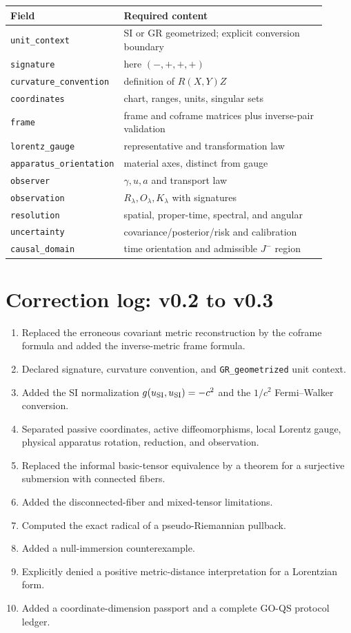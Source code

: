 \documentclass[11pt,a4paper]{article}
\theoremstyle{definition}
\theoremstyle{plain}
\theoremstyle{remark}
\begin{document}
\begin{longtable}{L{0.27\linewidth}L{0.64\linewidth}}
\toprule
Field & Required content\\
\midrule
\endhead
\texttt{unit\_context} & SI or GR geometrized; explicit conversion boundary\\
\texttt{signature} & here $(-,+,+,+)$\\
\texttt{curvature\_convention} & definition of $R(X,Y)Z$\\
\texttt{coordinates} & chart, ranges, units, singular sets\\
\texttt{frame} & frame and coframe matrices plus inverse-pair validation\\
\texttt{lorentz\_gauge} & representative and transformation law\\
\texttt{apparatus\_orientation} & material axes, distinct from gauge\\
\texttt{observer} & $\gamma,u,a$ and transport law\\
\texttt{observation} & $R_\lambda,O_\lambda,K_\lambda$ with signatures\\
\texttt{resolution} & spatial, proper-time, spectral, and angular\\
\texttt{uncertainty} & covariance/posterior/risk and calibration\\
\texttt{causal\_domain} & time orientation and admissible $J^-$ region\\
\bottomrule
\end{longtable}

\section{Correction log: v0.2 to v0.3}

\begin{enumerate}[leftmargin=*]
\item Replaced the erroneous covariant metric reconstruction by the
coframe formula and added the inverse-metric frame formula.
\item Declared signature, curvature convention, and
\texttt{GR\_geometrized} unit context.
\item Added the SI normalization $g(u_{\rm SI},u_{\rm SI})=-c^2$ and the
$1/c^2$ Fermi--Walker conversion.
\item Separated passive coordinates, active diffeomorphisms, local Lorentz
gauge, physical apparatus rotation, reduction, and observation.
\item Replaced the informal basic-tensor equivalence by a theorem for a
surjective submersion with connected fibers.
\item Added the disconnected-fiber and mixed-tensor limitations.
\item Computed the exact radical of a pseudo-Riemannian pullback.
\item Added a null-immersion counterexample.
\item Explicitly denied a positive metric-distance interpretation for a
Lorentzian form.
\item Added a coordinate-dimension passport and a complete GO-QS protocol
ledger.
\end{enumerate}
\end{document}
